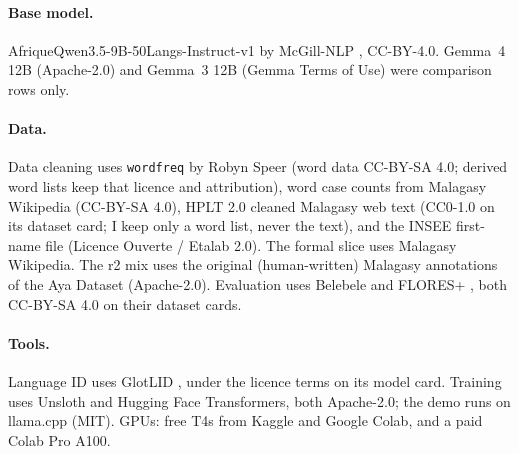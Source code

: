 \documentclass[11pt]{article}
\begin{document}
\paragraph{Base model.} AfriqueQwen3.5-9B-50Langs-Instruct-v1 by McGill-NLP \citep{afriqueqwen},
CC-BY-4.0. Gemma~4 12B \citep{gemma4} (Apache-2.0) and Gemma~3 12B \citep{gemma3} (Gemma Terms of Use)
were comparison rows only.

\paragraph{Data.} Data cleaning uses \texttt{wordfreq} by Robyn Speer \citep{wordfreq} (word data
CC-BY-SA 4.0; derived word lists keep that licence and attribution), word case counts from Malagasy
Wikipedia \citep{wikipedia-dump} (CC-BY-SA 4.0), HPLT 2.0 cleaned Malagasy web text \citep{hplt2}
(CC0-1.0 on its dataset card; I keep only a word list, never the text), and the INSEE first-name file
\citep{insee-prenoms} (Licence Ouverte / Etalab 2.0). The formal slice uses Malagasy Wikipedia.
The r2 mix uses the original (human-written) Malagasy annotations of the Aya Dataset \citep{singh2024aya}
(Apache-2.0). Evaluation uses Belebele \citep{bandarkar-etal-2024-belebele} and FLORES+ \citep{floresplus}, both
CC-BY-SA 4.0 on their dataset cards.

\paragraph{Tools.} Language ID uses GlotLID \citep{kargaran-etal-2023-glotlid}, under the licence terms on
its model card. Training uses Unsloth \citep{unsloth} and Hugging Face Transformers, both Apache-2.0; the
demo runs on llama.cpp (MIT). GPUs: free T4s from Kaggle and Google Colab, and a paid Colab Pro A100.



\end{document}
